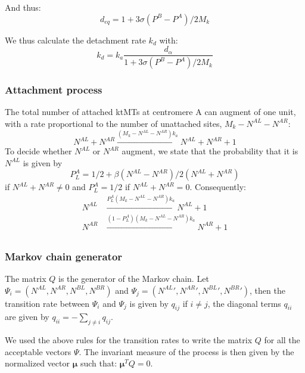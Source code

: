 \documentclass[a4paper,12pt]{article}
\begin{document}
And thus:
\begin{equation}
  \label{eq:deq}
  d_{eq} = 1 +  3 \sigma \left(P^B - P^A\right)/2M_k
\end{equation}

We thus calculate the detachment rate $k_d$ with:
\begin{equation}
  \label{eq:def_kf_markov}
  k_d  =   k_a \frac{d_{\alpha}}{1 + 3 \sigma \left(P^B - P^A\right)/2
    M_k} 
\end{equation}


\subsubsection{Attachment process}


The total number of attached ktMTs at centromere A can augment of one
unit, with a rate proportional to the number of unattached sites, $M_k
 -  N^{AL} -  N^{AR} $:
\begin{equation}
  N^{AL} + N^{AR} \xrightarrow{\left(M_k -
      N^{AL}-N^{AR}\right)k_a} N^{AL}+ N^{AR} + 1%
\end{equation}
To decide whether $N^{AL}$ or $N^{AR}$ augment, we state that the
probability that it is $N^{AL}$ is given by 
$$P_L^A = 1/2 + \beta\left(N^{AL} - N^{AR}\right)/2(N^{AL} + N^{AR})$$
if $N^{AL} + N^{AR} \neq 0$ and $P_L^A = 1/2$ if $N^{AL} + N^{AR} =
0$.  Consequently:
\begin{equation}
  \begin{aligned}
    N^{AL}&\xrightarrow{P_L^A\left(M_k -
        N^{AL}-N^{AR}\right)k_a} N^{AL} + 1\\
    N^{AR}&\xrightarrow{\left(1 - P_L^A\right)\left(M_k -
        N^{AL}-N^{AR}\right)k_a} N^{AR} + 1\\
  \end{aligned}
\end{equation}


\subsubsection{Markov chain generator}
\label{sec:mcg}

The matrix $Q$ is the generator of the Markov chain. Let $\Psi_i = (
N^{AL}, N^{AR}, N^{BL}, N^{BR})$ and $\Psi_j = (
{N^{AL}}', {N^{AR}}', {N^{BL}}', {N^{BR}}')$, then the transition rate between
$\Psi_i$ and $\Psi_j$ is given by $q_{ij}$ if $i \neq j$, the diagonal
terms $q_{ii}$ are given by $q_{ii} = - \sum_{j \neq i} q_{ij} $. 

We used the above rules for the transition rates to write the matrix
$Q$ for all the acceptable vectors $\Psi$. The invariant measure of
the process is then given by the normalized  vector
$\mathbf{\mu}$ such that: $\mathbf{\mu}^TQ = 0$.
\end{document}
